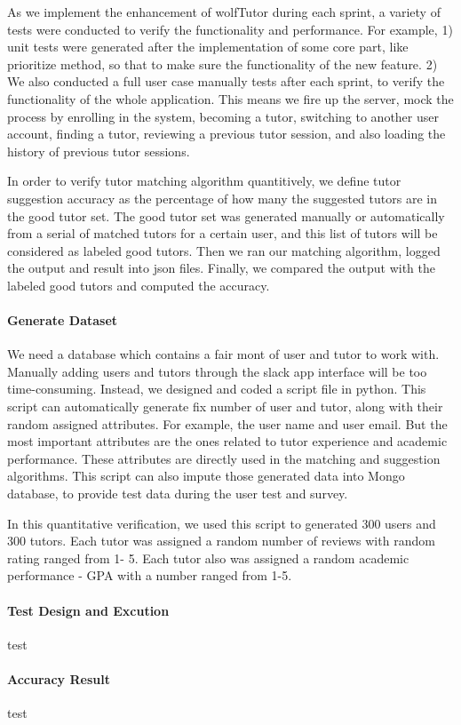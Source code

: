 As we implement the enhancement of wolfTutor during each sprint, 
a variety of tests were conducted to verify the functionality and performance. 
For example, 1) unit tests were generated after the implementation of some 
core part, like prioritize method, so that to make sure the functionality of the 
new feature. 2) We also conducted a full user case manually tests after each 
sprint, to verify the functionality of the whole application. This means we fire 
up the server, mock the process by enrolling in the system,  becoming a tutor, 
switching to another user account, finding a tutor,  reviewing a previous tutor 
session, and also loading the history of previous tutor sessions.

In order to verify tutor matching algorithm quantitively, we define tutor 
suggestion accuracy as the percentage of how many the suggested tutors 
are in the good tutor set. The good tutor set was generated manually or 
automatically from a serial of matched tutors for a certain user, and this list 
of tutors will be considered as labeled good tutors. Then we ran our matching 
algorithm, logged the output and result into json files. Finally, we compared the 
output with the labeled good tutors and computed the accuracy.

\paragraph{Generate Dataset}
We need a database which contains a fair mont of user and tutor to work with. 
Manually adding users and tutors through the slack app interface will be too time-consuming. 
Instead, we designed and coded a script file in python. This script can automatically generate fix number of user and tutor, along with their random assigned attributes. For example, the user name and user email. But the most important attributes are the ones related to tutor experience and academic performance. These attributes are directly used in the matching and suggestion algorithms. This script can also impute those generated data into Mongo database, to provide test data during the user test and survey.

In this quantitative verification, we used this script to generated 300 users and 300 tutors. Each tutor was assigned a random number of reviews with random rating ranged from 1- 5. Each tutor also was assigned a random academic performance - GPA with a number ranged from 1-5. 

\paragraph{Test Design and Excution} 
test

\paragraph{Accuracy Result} 
test


